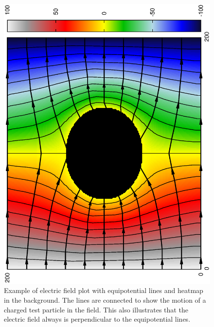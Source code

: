\documentclass[aps,twocolumn,pre,nofootinbib,10pt]{revtex4-1}
\begin{document}
\begin{figure}[h]
\begin{center}
\includegraphics[height=\breite \columnwidth,angle=-90]{efield_plus_eqlines2.ps}
\caption{Example of electric field plot with equipotential lines and heatmap in the background. The lines are connected to show the motion of a charged test particle in the field. This also illustrates that the electric field always is perpendicular to the equipotential lines.}
\label{efieldlines}
\end{center}
\end{figure}
\end{document}
